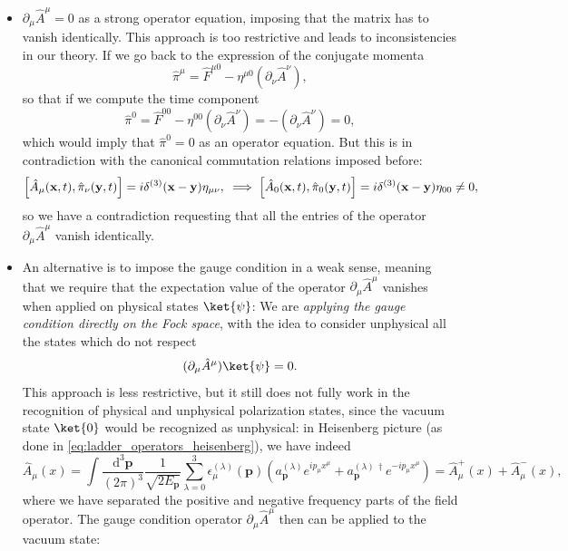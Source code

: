 \begin{itemize}
    \item \(\partial_\mu \hat{A}^{\mu} = 0\) as a strong operator equation, imposing that the matrix has to vanish identically. This approach is too restrictive and leads to inconsistencies in our theory.
          If we go back to the expression of the conjugate momenta
          \[
              \hat{\pi}^\mu = \hat{F}^{\mu 0} - \eta^{\mu 0} (\partial_\nu \hat{A}^{\nu}),
          \]
          so that if we compute the time component
          \[
              \hat{\pi}^0 = \hat{F}^{0 0} - \eta^{0 0} (\partial_\nu \hat{A}^{\nu}) = - (\partial_\nu \hat{A}^{\nu}) = 0,
          \]
          which would imply that \(\hat{\pi}^0 = 0\) as an operator equation. But this is in contradiction with the canonical commutation relations imposed before:
          \[
              \left[\hat{A}_{\mu}(\mathbf{x}, t), \hat{\pi}_{\nu}(\mathbf{y}, t)\right] = i \delta^{(3)}(\mathbf{x} - \mathbf{y}) \eta_{\mu \nu}, \\
              \implies \left[\hat{A}_{0}(\mathbf{x}, t), \hat{\pi}_{0}(\mathbf{y}, t)\right] = i \delta^{(3)}(\mathbf{x} - \mathbf{y}) \eta_{00} \neq 0,
          \]
          so we have a contradiction requesting that all the entries of the operator \(\partial_\mu \hat{A}^{\mu}\) vanish identically.
    \item An alternative is to impose the gauge condition in a weak sense, meaning that we require that the expectation value of the operator \(\partial_\mu \hat{A}^{\mu}\) vanishes when applied on physical states \(\ket{\psi}\): We are \textit{applying the gauge condition directly on the Fock space}, with the idea to consider unphysical all the states which do not respect
          \[
              (\partial_\mu \hat{A}^{\mu}) \ket{\psi} = 0.
          \]
          This approach is less restrictive, but it still does not fully work in the recognition of physical and unphysical polarization states, since the vacuum state \(\ket{0}\) would be recognized as unphysical: in Heisenberg picture (as done in \eqref{eq:ladder_operators_heisenberg}), we have indeed
          \[
              \hat{A}_\mu(x) = \int \frac{\mathrm{d}^3 \mathbf{p}}{(2\pi)^3} \frac{1}{\sqrt{2 E_{\mathbf{p}}}} \sum_{\lambda=0}^{3} \epsilon_{\mu}^{(\lambda)}(\mathbf{p}) \left( a^{(\lambda)}_{\mathbf{p}} e^{i p_\mu x^{\mu}} + a^{(\lambda)\,\dagger}_{\mathbf{p}} e^{-i p_\mu x^{\mu}} \right) = \hat{A}_\mu^{+}(x) + \hat{A}_\mu^{-}(x),
          \]
          where we have separated the positive and negative frequency parts of the field operator. The gauge condition operator \(\partial_\mu \hat{A}^{\mu}\) then can be applied to the vacuum state:

\end{itemize}
